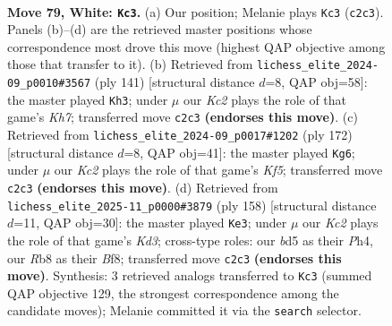 \documentclass[11pt]{article}
\begin{document}
\clearpage

\begin{figure}[p]\centering
\begin{subfigure}{0.46\textwidth}\centering
\resizebox{\linewidth}{!}{%
\newchessgame
\chessboard[
  setfen={1R6/3k4/8/3b4/1P6/8/2K4r/4R3 w - - 31 79},
  showmover=false,
  pgfstyle=straightmove, color=movearrow, markmove={c2-c3}
]}
\caption{}
\end{subfigure}\hfill
\begin{subfigure}{0.46\textwidth}\centering
\resizebox{\linewidth}{!}{%
\newchessgame
\chessboard[
  setfen={8/8/8/5K2/3r3p/8/1R5k/8 b - - 9 71},
  showmover=false,
  pgfstyle=straightmove, color=movearrow, markmove={h2-h3}
]}
\caption{}
\end{subfigure}
\\[4pt]
\begin{subfigure}{0.46\textwidth}\centering
\resizebox{\linewidth}{!}{%
\newchessgame
\chessboard[
  setfen={5k2/1R5P/8/5K2/8/8/5r2/8 w - - 3 87},
  showmover=false,
  pgfstyle=straightmove, color=movearrow, markmove={f5-g6}
]}
\caption{}
\end{subfigure}\hfill
\begin{subfigure}{0.46\textwidth}\centering
\resizebox{\linewidth}{!}{%
\newchessgame
\chessboard[
  setfen={5B2/8/R6P/3k4/7P/3K4/8/3r4 w - - 1 80},
  showmover=false,
  pgfstyle=straightmove, color=movearrow, markmove={d3-e3}
]}
\caption{}
\end{subfigure}
\caption{\textbf{Move 79, White: \texttt{Kc3}.} (a) Our position; Melanie plays \texttt{Kc3} (\texttt{c2c3}). Panels (b)--(d) are the retrieved master positions whose correspondence most drove this move (highest QAP objective among those that transfer to it). (b) Retrieved from \texttt{lichess\_elite\_2024-09\_p0010\#3567} (ply 141) [structural distance $d$=8, QAP obj=58]: the master played \texttt{Kh3}; under $\mu$ our \emph{Kc2} plays the role of that game's \emph{Kh7}; transferred move \texttt{c2c3} \textbf{(endorses this move)}. (c) Retrieved from \texttt{lichess\_elite\_2024-09\_p0017\#1202} (ply 172) [structural distance $d$=8, QAP obj=41]: the master played \texttt{Kg6}; under $\mu$ our \emph{Kc2} plays the role of that game's \emph{Kf5}; transferred move \texttt{c2c3} \textbf{(endorses this move)}. (d) Retrieved from \texttt{lichess\_elite\_2025-11\_p0000\#3879} (ply 158) [structural distance $d$=11, QAP obj=30]: the master played \texttt{Ke3}; under $\mu$ our \emph{Kc2} plays the role of that game's \emph{Kd3}; cross-type roles: our \emph{b}d5 as their \emph{P}h4, our \emph{R}b8 as their \emph{B}f8; transferred move \texttt{c2c3} \textbf{(endorses this move)}. Synthesis: 3 retrieved analogs transferred to \texttt{Kc3} (summed QAP objective 129, the strongest correspondence among the candidate moves); Melanie committed it via the \texttt{search} selector.}
\label{fig:thought-m156}
\end{figure}
\end{document}
